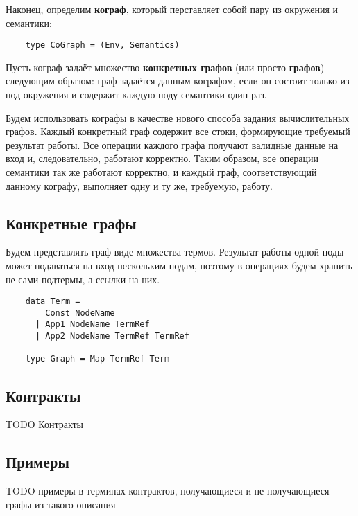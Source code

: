 Наконец, определим \textbf{кограф}, который перставляет собой пару из окружения и семантики:
\begin{lstlisting}
    type CoGraph = (Env, Semantics)
\end{lstlisting}

Пусть кограф задаёт множество \textbf{конкретных графов} (или просто \textbf{графов}) следующим образом:
граф задаётся данным кографом, если он состоит только из нод окружения и содержит каждую ноду семантики один раз.

Будем использовать кографы в качестве нового способа задания вычислительных графов.
Каждый конкретный граф содержит все стоки, формирующие требуемый результат работы.
Все операции каждого графа получают валидные данные на вход и, следовательно, работают корректно.
Таким образом, все операции семантики так же работают корректно, и каждый граф, соответствующий данному кографу, выполняет одну и ту же, требуемую, работу.

\subsection{Конкретные графы}

Будем представлять граф виде множества термов. Результат работы одной ноды может подаваться на вход нескольким нодам, поэтому в операциях будем хранить не сами подтермы, а ссылки на них.

\begin{lstlisting}
    data Term =
        Const NodeName
      | App1 NodeName TermRef
      | App2 NodeName TermRef TermRef

    type Graph = Map TermRef Term
\end{lstlisting}

\subsection{Контракты}

TODO Контракты

\subsection{Примеры}

TODO примеры в терминах контрактов, получающиеся и не получающиеся графы из такого описания
